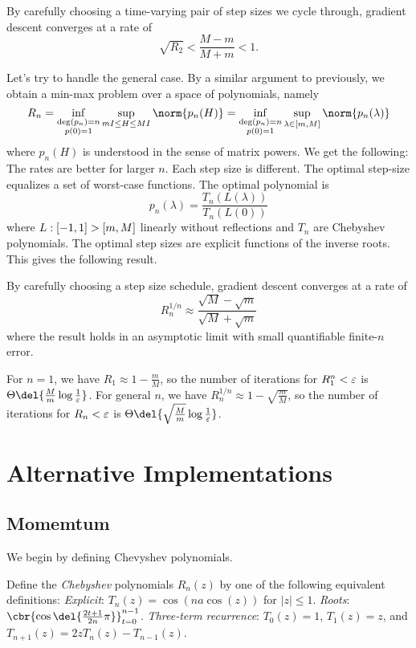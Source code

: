 \documentclass{article}
\begin{document}
\begin{theorem}
By carefully choosing a time-varying pair of step sizes we cycle through, gradient descent converges at a rate of 
\[
\sqrt{R_2} < \frac{M-m}{M+m} < 1
.
\]
\end{theorem}

Let's try to handle the general case.
By a similar argument to previously, we obtain a min-max problem over a space of polynomials, namely
\[
R_n = \inf_{\substack{\deg(p_n) = n\\p(0) = 1}} \sup_{m I \leq H \leq M I} \norm{p_n(H)} = \inf_{\substack{\deg(p_n) = n\\p(0) = 1}} \sup_{\lambda\in[m,M]} \norm{p_n(\lambda)}
\]
where $p_n(H)$ is understood in the sense of matrix powers.
We get the following:
\1 The rates are better for larger $n$. 
\2 Each step size is different.
\3 The optimal step-size equalizes a set of worst-case functions.
\0
The optimal polynomial is 
\[
p_n(\lambda) = \frac{T_n(L(\lambda))}{T_n(L(0))}
\]
where $L : [-1,1] \-> [m,M]$ linearly without reflections and $T_n$ are Chebyshev polynomials.
The optimal step sizes are explicit functions of the inverse roots.
This gives the following result.

\begin{theorem}
By carefully choosing a step size schedule, gradient descent converges at a rate of 
\[
R^{1/n}_n \approx \frac{\sqrt{M}-\sqrt{m}}{\sqrt{M}+\sqrt{m}}
\]
where the result holds in an asymptotic limit with small quantifiable finite-$n$ error.
\end{theorem}

For $n=1$, we have $R_1 \approx 1-\frac{m}{M}$, so the number of iterations for $R_1^n < \varepsilon$ is $\Theta\del{\frac{M}{m} \log \frac{1}{\eps}}$.
For general $n$, we have $R_n^{1/n} \approx 1 - \sqrt{\frac{m}{M}}$, so the number of iterations for $R_n < \varepsilon$ is $\Theta\del{\sqrt{\frac{M}{m}} \log\frac{1}{\eps}}$.

\section{Alternative Implementations}

\subsection{Momemtum}
We begin by defining Chevyshev polynomials.

\begin{definition}
Define the \emph{Chebyshev} polynomials $R_n(z)$ by one of the following equivalent definitions:
\1 \emph{Explicit}: $T_n(z) = \cos(n a \cos(z))$ for $|z| \leq 1$.
\2 \emph{Roots}: $\cbr{\cos\del{\frac{2t+1}{2n}\pi}}_{t=0}^{n-1}$.
\3 \emph{Three-term recurrence}: $T_0(z) = 1$, $T_1(z) = z$, and $T_{n+1}(z) = 2z T_n(z) - T_{n-1}(z)$.
\0
\end{definition}
\end{document}
